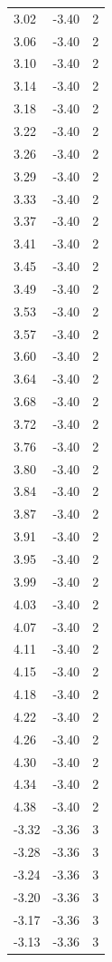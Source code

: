 \begin{longtable}{lrr}
  3.02 & -3.40 & 2 \\
  3.06 & -3.40 & 2 \\
  3.10 & -3.40 & 2 \\
  3.14 & -3.40 & 2 \\
  3.18 & -3.40 & 2 \\
  3.22 & -3.40 & 2 \\
  3.26 & -3.40 & 2 \\
  3.29 & -3.40 & 2 \\
  3.33 & -3.40 & 2 \\
  3.37 & -3.40 & 2 \\
  3.41 & -3.40 & 2 \\
  3.45 & -3.40 & 2 \\
  3.49 & -3.40 & 2 \\
  3.53 & -3.40 & 2 \\
  3.57 & -3.40 & 2 \\
  3.60 & -3.40 & 2 \\
  3.64 & -3.40 & 2 \\
  3.68 & -3.40 & 2 \\
  3.72 & -3.40 & 2 \\
  3.76 & -3.40 & 2 \\
  3.80 & -3.40 & 2 \\
  3.84 & -3.40 & 2 \\
  3.87 & -3.40 & 2 \\
  3.91 & -3.40 & 2 \\
  3.95 & -3.40 & 2 \\
  3.99 & -3.40 & 2 \\
  4.03 & -3.40 & 2 \\
  4.07 & -3.40 & 2 \\
  4.11 & -3.40 & 2 \\
  4.15 & -3.40 & 2 \\
  4.18 & -3.40 & 2 \\
  4.22 & -3.40 & 2 \\
  4.26 & -3.40 & 2 \\
  4.30 & -3.40 & 2 \\
  4.34 & -3.40 & 2 \\
  4.38 & -3.40 & 2 \\
  -3.32 & -3.36 & 3 \\
  -3.28 & -3.36 & 3 \\
  -3.24 & -3.36 & 3 \\
  -3.20 & -3.36 & 3 \\
  -3.17 & -3.36 & 3 \\
  -3.13 & -3.36 & 3 \\

\end{longtable}
